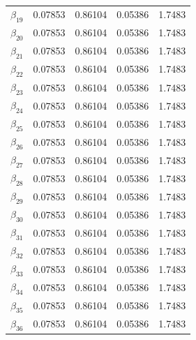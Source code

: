 \begin{table} [H]
\begin{tabularx}{\textwidth}{l|XXXX}
		$\beta_{19}$ & 0.07853 & 0.86104 & 0.05386 & 1.7483\\
		$\beta_{20}$ & 0.07853 & 0.86104 & 0.05386 & 1.7483\\
		$\beta_{21}$ & 0.07853 & 0.86104 & 0.05386 & 1.7483\\
		$\beta_{22}$ & 0.07853 & 0.86104 & 0.05386 & 1.7483\\
		$\beta_{23}$ & 0.07853 & 0.86104 & 0.05386 & 1.7483\\
		$\beta_{24}$ & 0.07853 & 0.86104 & 0.05386 & 1.7483\\
		$\beta_{25}$ & 0.07853 & 0.86104 & 0.05386 & 1.7483\\
		$\beta_{26}$ & 0.07853 & 0.86104 & 0.05386 & 1.7483\\
		$\beta_{27}$ & 0.07853 & 0.86104 & 0.05386 & 1.7483\\
		$\beta_{28}$ & 0.07853 & 0.86104 & 0.05386 & 1.7483\\
		$\beta_{29}$ & 0.07853 & 0.86104 & 0.05386 & 1.7483\\
		$\beta_{30}$ & 0.07853 & 0.86104 & 0.05386 & 1.7483\\
		$\beta_{31}$ & 0.07853 & 0.86104 & 0.05386 & 1.7483\\
		$\beta_{32}$ & 0.07853 & 0.86104 & 0.05386 & 1.7483\\
		$\beta_{33}$ & 0.07853 & 0.86104 & 0.05386 & 1.7483\\
		$\beta_{34}$ & 0.07853 & 0.86104 & 0.05386 & 1.7483\\
		$\beta_{35}$ & 0.07853 & 0.86104 & 0.05386 & 1.7483\\
		$\beta_{36}$ & 0.07853 & 0.86104 & 0.05386 & 1.7483\\ \hline
	\end{tabularx}
\end{table}